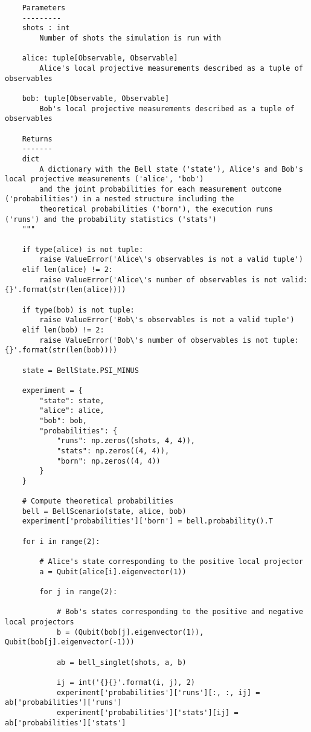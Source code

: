 \begin{verbatim}
    Parameters
    ---------
    shots : int
        Number of shots the simulation is run with

    alice: tuple[Observable, Observable]
        Alice's local projective measurements described as a tuple of observables

    bob: tuple[Observable, Observable]
        Bob's local projective measurements described as a tuple of observables

    Returns
    -------
    dict
        A dictionary with the Bell state ('state'), Alice's and Bob's local projective measurements ('alice', 'bob')
        and the joint probabilities for each measurement outcome ('probabilities') in a nested structure including the
        theoretical probabilities ('born'), the execution runs ('runs') and the probability statistics ('stats')
    """

    if type(alice) is not tuple:
        raise ValueError('Alice\'s observables is not a valid tuple')
    elif len(alice) != 2:
        raise ValueError('Alice\'s number of observables is not valid:{}'.format(str(len(alice))))

    if type(bob) is not tuple:
        raise ValueError('Bob\'s observables is not a valid tuple')
    elif len(bob) != 2:
        raise ValueError('Bob\'s number of observables is not tuple:{}'.format(str(len(bob))))

    state = BellState.PSI_MINUS

    experiment = {
        "state": state,
        "alice": alice,
        "bob": bob,
        "probabilities": {
            "runs": np.zeros((shots, 4, 4)),
            "stats": np.zeros((4, 4)),
            "born": np.zeros((4, 4))
        }
    }

    # Compute theoretical probabilities
    bell = BellScenario(state, alice, bob)
    experiment['probabilities']['born'] = bell.probability().T

    for i in range(2):

        # Alice's state corresponding to the positive local projector
        a = Qubit(alice[i].eigenvector(1))

        for j in range(2):

            # Bob's states corresponding to the positive and negative local projectors
            b = (Qubit(bob[j].eigenvector(1)), Qubit(bob[j].eigenvector(-1)))

            ab = bell_singlet(shots, a, b)

            ij = int('{}{}'.format(i, j), 2)
            experiment['probabilities']['runs'][:, :, ij] = ab['probabilities']['runs']
            experiment['probabilities']['stats'][ij] = ab['probabilities']['stats']


\end{verbatim}
